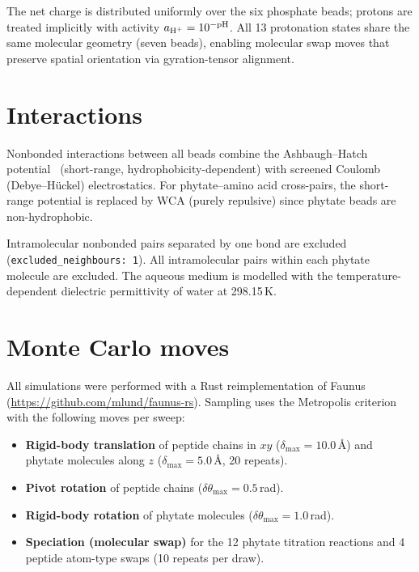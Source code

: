 \documentclass[11pt]{article}
\begin{document}
\noindent
The net charge is distributed uniformly over the six phosphate beads;
protons are treated implicitly with activity $a_{\ce{H+}} =
10^{-\text{pH}}$.  All 13 protonation states share the same molecular
geometry (seven beads), enabling molecular swap moves that preserve
spatial orientation via gyration-tensor alignment.

\section{Interactions}

Nonbonded interactions between all beads combine the Ashbaugh--Hatch
potential~\cite{Ashbaugh2008} (short-range, hydrophobicity-dependent)
with screened Coulomb (Debye--H\"uckel) electrostatics.
For phytate--amino acid cross-pairs, the short-range potential is
replaced by WCA (purely repulsive) since phytate beads are
non-hydrophobic.

Intramolecular nonbonded pairs separated by one bond are excluded
(\texttt{excluded\_neighbours:~1}).  All intramolecular pairs within
each phytate molecule are excluded.
The aqueous medium is modelled with the temperature-dependent
dielectric permittivity of water at 298.15\,K.

\section{Monte Carlo moves}

All simulations were performed with a Rust reimplementation of
Faunus~\cite{Stenqvist2013} (\url{https://github.com/mlund/faunus-rs}).
Sampling uses the Metropolis criterion with the following moves per sweep:

\begin{itemize}
\item \textbf{Rigid-body translation} of peptide chains in $xy$
      ($\delta_\text{max} = 10.0$\,\AA) and phytate molecules along $z$
      ($\delta_\text{max} = 5.0$\,\AA, 20 repeats).
\item \textbf{Pivot rotation} of peptide chains
      ($\delta\theta_\text{max} = 0.5$\,rad).
\item \textbf{Rigid-body rotation} of phytate molecules
      ($\delta\theta_\text{max} = 1.0$\,rad).
\item \textbf{Speciation (molecular swap)} for the 12 phytate
      titration reactions and 4 peptide atom-type swaps
      (10 repeats per draw).
\end{itemize}
\end{document}
